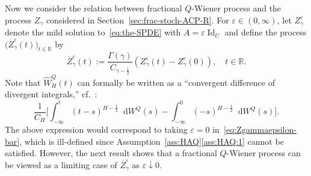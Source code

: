 \documentclass[reqno]{amsart}
\numberwithin{equation}{section}
\newcommand{\R}{\mathbb{R}}
\newcommand{\rd}{\mathop{}\!\mathrm{d}}
\newcommand{\id}{\operatorname{Id}}
\theoremstyle{remark}
\theoremstyle{definition}
\begin{document}
Now we consider the relation between fractional $Q$-Wiener process
and the process $Z_\gamma$ considered in Section~\ref{sec:frac-stoch-ACP-R}.
For $\varepsilon \in (0,\infty)$, let $Z_\gamma^\varepsilon$ denote the mild solution
to~\eqref{eq:the-SPDE} with $A = \varepsilon \id_U$
and define the process 
$\bigl(\overline Z_\gamma^\varepsilon(t)\bigr)_{t \in \R}$ by 
%
\begin{equation}\label{eq:Zgammaepsilon-bar}
	\overline Z_\gamma^\varepsilon(t) := \frac{\Gamma(\gamma)}{C_{\gamma-\frac{1}{2}}} (Z_\gamma^\varepsilon(t) - Z_\gamma^\varepsilon(0)),
	\quad
	t \in \R.
\end{equation}
%
Note that
$\widehat W^Q_H(t)$ can formally be written as a
``convergent difference of divergent integrals,'' cf.~\cite[Footnote~3]{MandelbrotVanNess1968}:
%
\[
\frac{1}{C_H}
\biggl[
\int_{-\infty}^{t}(t-s)^{H-\frac{1}{2}} \rd W^Q(s)
-
\int_{-\infty}^{0}(-s)^{H-\frac{1}{2}} \rd W^Q(s)
\biggr].
\]
%
The above expression would correspond to taking $\varepsilon = 0$ in~\eqref{eq:Zgammaepsilon-bar},
which is ill-defined
since Assumption~\ref{ass:HAQ}\ref{ass:HAQ:1} cannot be satisfied.
However, the next result shows that a fractional $Q$-Wiener process
can be viewed as a limiting case of $\overline Z_\gamma^\varepsilon$ as $\varepsilon \downarrow 0$.
\end{document}
